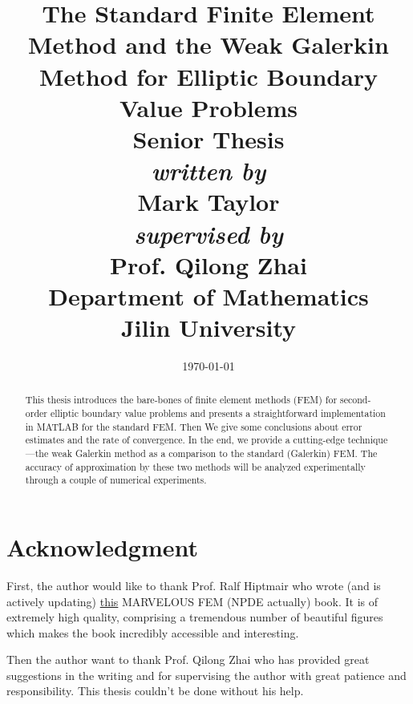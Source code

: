 

	
	\title{
		{The Standard Finite Element Method and the Weak Galerkin Method for 
			Elliptic Boundary Value Problems}\\
		\textbf{{\Large Senior Thesis}}\\[1cm]
	
		\textit{{\Large written by}}\\
		{{\Large Mark Taylor}}\\[1cm]
		
		\textit{{\Large supervised by}}\\
		{\Large Prof. Qilong Zhai}\\
		
		{\Large Department of Mathematics}\\
		{\Large Jilin University}
	}	
	\date{\today}
	\maketitle
	\thispagestyle{empty}
	
	\begin{abstract}
		\normalsize		
		This thesis introduces the bare-bones of finite element methods (FEM)
		for second-order elliptic boundary value problems and presents a
		straightforward implementation in MATLAB for the standard FEM. Then 
		We give some conclusions about error estimates and the rate of 
		convergence. In the end, we provide a cutting-edge 
		technique---the weak Galerkin method as a comparison to the 
		standard (Galerkin) FEM. The accuracy of approximation by these two
		methods will be analyzed experimentally through a couple of numerical 
		experiments.
	\end{abstract}
	
	\clearpage
	\section*{Acknowledgment}
	First, the author would like to thank Prof. Ralf Hiptmair who wrote (and 
	is actively updating) 
	\href{https://www.sam.math.ethz.ch/~grsam/NUMPDEFL/NUMPDE.pdf}{this} 
	MARVELOUS FEM (NPDE actually) book. It is of extremely high quality, 
	comprising a tremendous number of beautiful figures which makes the book 
	incredibly accessible and interesting. %
	
	Then the author	want to thank Prof. Qilong Zhai who has provided great 
	suggestions in the writing and for supervising the author with great
	patience and responsibility. This thesis couldn't be done without his help.
	

